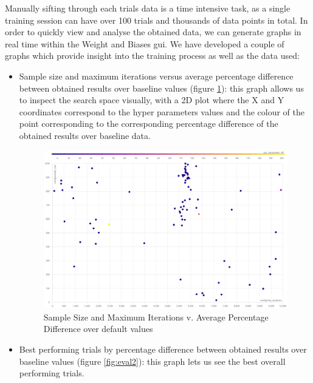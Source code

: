 Manually sifting through each trials data is a time intensive task, as a single training session can have over 100 trials and thousands of data points in total. In order to quickly view and analyse the obtained data, we can generate graphs in real time within the Weight and Biases \acrshort{gui}. We have developed a couple of graphs which provide insight into the training process as well as the data used:

\begin{itemize}
	\item Sample size and maximum iterations versus average percentage difference between obtained results over baseline values (figure \ref{fig:eval1}): this graph allows us to inspect the search space visually, with a 2D plot where the X and Y coordinates correspond to the hyper parameters values and the colour of the point corresponding to the corresponding percentage difference of the obtained results over baseline data.

	\begin{figure}[h]
	\centering
	\includegraphics[width=\textwidth, keepaspectratio]{images/ss_mi_ad.png}
	\caption{Sample Size and Maximum Iterations v. Average Percentage Difference over default values}
	\label{fig:eval1}
	\end{figure}

	\item Best performing trials by percentage difference between obtained results over baseline values (figure \ref{fig:eval2}): this graph lets us see the best overall performing trials.


\end{itemize}
